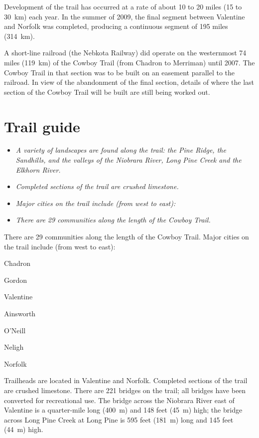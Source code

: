 Development of the trail has occurred at a rate of about 10 to 20 miles
(15 to 30~km) each year. In the summer of 2009, the final segment
between Valentine and Norfolk was completed, producing a continuous
segment of 195 miles (314~km).

A short-line railroad (the Nebkota Railway) did operate on the
westernmost 74 miles (119~km) of the Cowboy Trail (from Chadron to
Merriman) until 2007. The Cowboy Trail in that section was to be built
on an easement parallel to the railroad. In view of the abandonment of
the final section, details of where the last section of the Cowboy Trail
will be built are still being worked out.

\section{Trail guide}\label{trail-guide}

\begin{itemize}
\item
  \emph{A variety of landscapes are found along the trail: the Pine
  Ridge, the Sandhills, and the valleys of the Niobrara River, Long Pine
  Creek and the Elkhorn River.}
\item
  \emph{Completed sections of the trail are crushed limestone.}
\item
  \emph{Major cities on the trail include (from west to east):}
\item
  \emph{There are 29 communities along the length of the Cowboy Trail.}
\end{itemize}

There are 29 communities along the length of the Cowboy Trail. Major
cities on the trail include (from west to east):

Chadron

Gordon

Valentine

Ainsworth

O'Neill

Neligh

Norfolk

Trailheads are located in Valentine and Norfolk. Completed sections of
the trail are crushed limestone. There are 221 bridges on the trail; all
bridges have been converted for recreational use. The bridge across the
Niobrara River east of Valentine is a quarter-mile long (400~m) and 148
feet (45~m) high; the bridge across Long Pine Creek at Long Pine is 595
feet (181~m) long and 145 feet (44~m) high.

